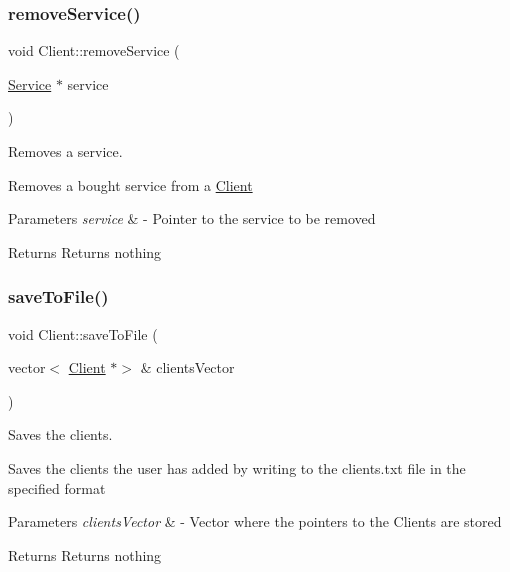 \subsubsection{\texorpdfstring{remove\+Service()}{removeService()}}
{\footnotesize\ttfamily void Client\+::remove\+Service (\begin{DoxyParamCaption}\item[{\hyperlink{class_service}{Service} $\ast$}]{service }\end{DoxyParamCaption})}



Removes a service. 

Removes a bought service from a \hyperlink{class_client}{Client}


\begin{DoxyParams}{Parameters}
{\em service} & -\/ Pointer to the service to be removed \\
\hline
\end{DoxyParams}
\begin{DoxyReturn}{Returns}
Returns nothing 
\end{DoxyReturn}
\mbox{\label{class_client_aceebaabb74ad1e3e5b30c168e5ef681b}} 
\subsubsection{\texorpdfstring{save\+To\+File()}{saveToFile()}}
{\footnotesize\ttfamily void Client\+::save\+To\+File (\begin{DoxyParamCaption}\item[{vector$<$ \hyperlink{class_client}{Client} $\ast$$>$ \&}]{clients\+Vector }\end{DoxyParamCaption})\hspace{0.3cm}{\ttfamily [static]}}



Saves the clients. 

Saves the clients the user has added by writing to the clients.\+txt file in the specified format


\begin{DoxyParams}{Parameters}
{\em clients\+Vector} & -\/ Vector where the pointers to the Clients are stored \\
\hline
\end{DoxyParams}
\begin{DoxyReturn}{Returns}
Returns nothing 
\end{DoxyReturn}
\mbox{\label{class_client_a74aaf687afd20e14f0ce93bac63a6fe3}} 
